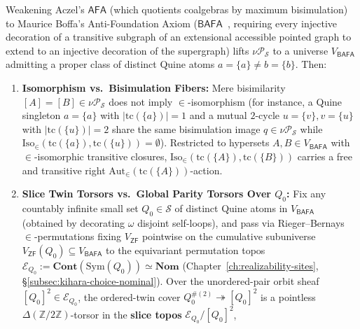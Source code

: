 \begin{proposition}\label{prop:boffa-torsors}%
%
\leanwitness%
%
Weakening Aczel's $\mathsf{AFA}$ (which quotients coalgebras by maximum bisimulation) to Maurice Boffa's Anti-Foundation Axiom ($\mathsf{BAFA}$~\cite{Boffa69}, requiring every injective decoration of a transitive subgraph of an extensional accessible pointed graph to extend to an injective decoration of the supergraph) lifts $\nu \mathcal{P}_{\mathcal{S}}$ to a universe $V_{\mathsf{BAFA}}$ admitting a proper class of distinct Quine atoms $a = \{a\} \neq b = \{b\}$. Then:
\begin{enumerate}[label=\textup{(\roman*)},leftmargin=1.8em]
  \item \textbf{Isomorphism vs.\ Bisimulation Fibers:} Mere bisimilarity $[A] = [B] \in \nu \mathcal{P}_{\mathcal{S}}$ does not imply $\in$-isomorphism (for instance, a Quine singleton $a = \{a\}$ with $|\mathrm{tc}(\{a\})| = 1$ and a mutual $2$-cycle $u = \{v\}, v = \{u\}$ with $|\mathrm{tc}(\{u\})| = 2$ share the same bisimulation image $q \in \nu \mathcal{P}_{\mathcal{S}}$ while $\mathrm{Iso}_\in(\mathrm{tc}(\{a\}), \mathrm{tc}(\{u\})) = \emptyset$). Restricted to hypersets $A, B \in V_{\mathsf{BAFA}}$ with $\in$-isomorphic transitive closures, $\mathrm{Iso}_\in(\mathrm{tc}(\{A\}), \mathrm{tc}(\{B\}))$ carries a free and transitive right $\mathrm{Aut}_\in(\mathrm{tc}(\{A\}))$-action.
  \item \textbf{Slice Twin Torsors vs.\ Global Parity Torsors Over $Q_0$:} Fix any countably infinite small set $Q_0 \in \mathcal{S}$ of distinct Quine atoms in $V_{\mathsf{BAFA}}$ (obtained by decorating $\omega$ disjoint self-loops), and pass via Rieger--Bernays~\cite{Bernays54,Rieger57} $\in$-permutations fixing $V_{\mathsf{ZF}}$ pointwise on the cumulative subuniverse $V_{\mathsf{ZF}}(Q_0) \subseteq V_{\mathsf{BAFA}}$ to the equivariant permutation topos $\mathcal{E}_{Q_0} := \mathbf{Cont}(\mathrm{Sym}(Q_0)) \simeq \mathbf{Nom}$ (Chapter~\ref{ch:realizability-sites}, \S\ref{subsec:kihara-choice-nominal}). Over the unordered-pair orbit sheaf $[Q_0]^2 \in \mathcal{E}_{Q_0}$, the ordered-twin cover $Q_0^{\#(2)} \twoheadrightarrow [Q_0]^2$ is a pointless $\Delta(\mathbb{Z}/2\mathbb{Z})$-torsor in the \textbf{slice topos} $\mathcal{E}_{Q_0}/[Q_0]^2$,

\end{enumerate}
\end{proposition}

